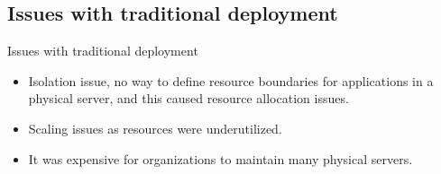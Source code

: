 \subsection{Issues with traditional deployment}\label{subsec:issues-with-traditional-deployment}
\begin{frame}{Issues with traditional deployment}
    \begin{itemize}[<+- | alert@+>]
        \item Isolation issue, no way to define resource boundaries for applications in a physical server, and this caused resource allocation issues.
        \item Scaling issues as resources were underutilized.
        \item It was expensive for organizations to maintain many physical servers.
    \end{itemize}
\end{frame}
